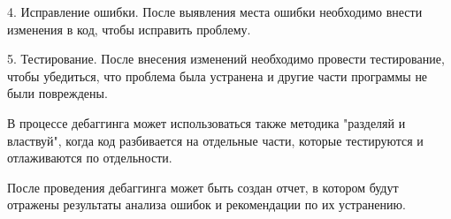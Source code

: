 \documentclass[utf8,14pt,a4paper,oneside,russian]{book}
\begin{document}
4. Исправление ошибки. После выявления места ошибки необходимо внести изменения в код, чтобы исправить проблему.

5. Тестирование. После внесения изменений необходимо провести тестирование, чтобы убедиться, что проблема была устранена и другие части программы не были повреждены.

В процессе дебаггинга может использоваться также методика "разделяй и властвуй", когда код разбивается на отдельные части, которые тестируются и отлаживаются по отдельности.

После проведения дебаггинга может быть создан отчет, в котором будут отражены результаты анализа ошибок и рекомендации по их устранению.

  
\end{document}
